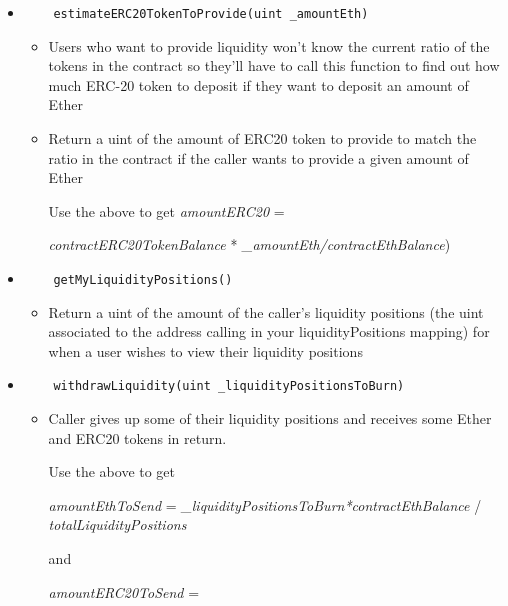 \documentclass[10pt]{article}
\begin{document}
\begin{itemize}
\item
\begin{verbatim}
    estimateERC20TokenToProvide(uint _amountEth)
\end{verbatim}
\begin{itemize}
    \item Users who want to provide liquidity won’t know the current ratio of the tokens in the contract so they’ll have to call this function to find out how much ERC-20 token to deposit if they want to deposit an amount of Ether
    \item Return a uint of the amount of ERC20 token to provide to match the ratio in the contract if the caller wants to provide a given amount of Ether
    
     
     Use the above to get {\it amountERC20} = 
     
     {\it contractERC20TokenBalance} * {\it \_amountEth/contractEthBalance})
\end{itemize}

\item
\begin{verbatim}
    getMyLiquidityPositions()
\end{verbatim}
\begin{itemize}
    \item Return a uint of the amount of the caller’s liquidity positions (the uint associated to the address calling in your liquidityPositions mapping) for when a user wishes to view their liquidity positions\end{itemize}

\item
\begin{verbatim}
    withdrawLiquidity(uint _liquidityPositionsToBurn)
\end{verbatim}
\begin{itemize}
    \item Caller gives up some of their liquidity positions and receives some Ether and ERC20 tokens in return.
    
    Use the above to get
    
     {\it amountEthToSend} = {\it \_liquidityPositionsToBurn*contractEthBalance} / {\it totalLiquidityPositions}
    
     and 
     
     {\it amountERC20ToSend} =
     

\end{itemize}
\end{itemize}
\end{document}
